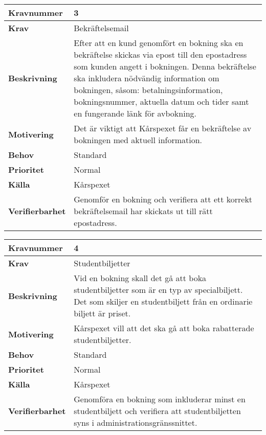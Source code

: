 \documentclass[a4paper, twoside, 11pt, titlepage]{article}
\begin{document}
\begin{tabular} { | p{3cm} | p{12.2cm} | }
	\hline
	\textbf{Kravnummer} & 3  \\
	\hline
	\textbf{Krav} & Bekräftelsemail  \\
	\hline
	\textbf{Beskrivning} & Efter att en kund genomfört en bokning ska en bekräftelse skickas via epost till den epostadress som kunden angett i bokningen. Denna bekräftelse ska inkludera nödvändig information om bokningen, såsom: betalningsinformation, bokningsnummer, aktuella datum och tider samt en fungerande länk för avbokning.  \\
	\hline
	\textbf{Motivering} & Det är viktigt att Kårspexet får en bekräftelse av bokningen med aktuell information.  \\
	\hline
	\textbf{Behov} & Standard  \\
	\hline
	\textbf{Prioritet} & Normal  \\
	\hline
	\textbf{Källa} & Kårspexet  \\
	\hline
	\textbf{Verifierbarhet} & Genomför en bokning och verifiera att ett korrekt bekräftelsemail har skickats ut till rätt epostadress.  \\
	\hline
\end{tabular}

\begin{tabular} { | p{3cm} | p{12.2cm} | }
	\hline
	\textbf{Kravnummer} & 4  \\
	\hline
	\textbf{Krav} & Studentbiljetter  \\
	\hline
	\textbf{Beskrivning} & Vid en bokning skall det gå att boka studentbiljetter som är en typ av specialbiljett. Det som skiljer en studentbiljett från en ordinarie biljett är priset.  \\
	\hline
	\textbf{Motivering} & Kårspexet vill att det ska gå att boka rabatterade studentbiljetter.  \\
	\hline
	\textbf{Behov} & Standard  \\
	\hline
	\textbf{Prioritet} & Normal  \\
	\hline
	\textbf{Källa} & Kårspexet  \\
	\hline
	\textbf{Verifierbarhet} & Genomföra en bokning som inkluderar minst en studentbiljett och verifiera att studentbiljetten syns i administrationsgränssnittet.  \\
	\hline
\end{tabular}
\end{document}
